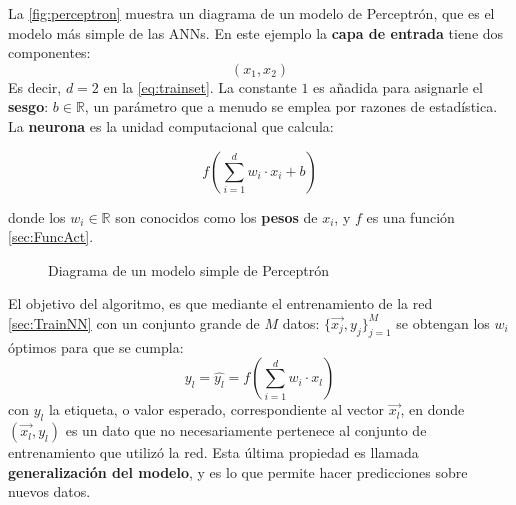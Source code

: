 La \autoref{fig:perceptron} muestra un diagrama de un modelo de Perceptrón, que es el modelo más simple de las \acp{ANN}. En este ejemplo la \textbf{capa de entrada} tiene dos componentes:
$$(x_1,x_2)$$
Es decir, $d=2$ en la \autoref{eq:trainset}. La constante $1$ es añadida para asignarle el \textbf{sesgo}: $b \in \mathbb{R}$, un parámetro que a menudo se emplea por razones de estadística. La \textbf{neurona} es la unidad computacional que calcula:

\begin{equation}
  \label{eq:neuronfun}
  f\left( \sum_{i=1}^dw_i\cdot x_i + b \right)
\end{equation}

donde los $w_i \in \mathbb{R}$ son conocidos como los \textbf{pesos} de $x_i$, y $f$ es una función \autoref{sec:FuncAct}.
\begin{figure}[hb]
  \centering

\caption{Diagrama de un modelo simple de Perceptrón}
\label{fig:perceptron}
\end{figure}

El objetivo del algoritmo, es que mediante el entrenamiento de la red \autoref{sec:TrainNN} con un conjunto grande de $M$ datos: $\{\vec{x_j},y_j\}_{j=1}^{M}$ se obtengan los $w_i$ óptimos para que se cumpla:
$$y_l= \hat{y_l} = f\left( \sum_{i=1}^dw_i\cdot x_l \right)$$
con $y_l$ la etiqueta, o valor esperado, correspondiente al vector $\vec{x_l}$, en donde $(\vec{x_l},y_l)$ es un dato que no necesariamente pertenece al conjunto de entrenamiento que utilizó la red. Esta última propiedad es llamada \textbf{generalización del modelo}, y es lo que permite hacer predicciones sobre nuevos datos.

